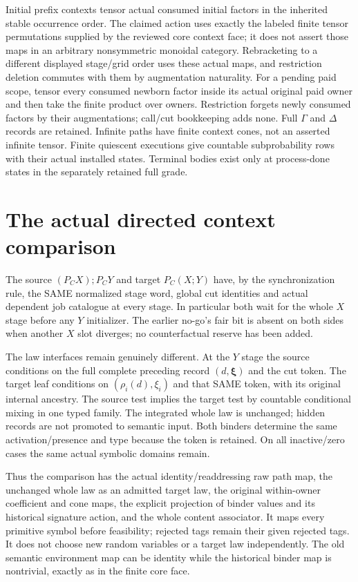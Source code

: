 \documentclass[11pt]{article}
\begin{document}
Initial prefix contexts tensor actual consumed initial factors in the inherited stable occurrence order. The claimed action uses exactly the labeled finite tensor permutations supplied by the reviewed core context face; it does not assert those maps in an arbitrary nonsymmetric monoidal category. Rebracketing to a different displayed stage/grid order uses these actual maps, and restriction deletion commutes with them by augmentation naturality. For a pending paid scope, tensor every consumed newborn factor inside its actual original paid owner and then take the finite product over owners. Restriction forgets newly consumed factors by their augmentations; call/cut bookkeeping adds none. Full $\Gamma$ and $\Delta$ records are retained. Infinite paths have finite context cones, not an asserted infinite tensor. Finite quiescent executions give countable subprobability rows with their actual installed states. Terminal bodies exist only at process-done states in the separately retained full grade.

\section{The actual directed context comparison}
The source $(P_CX);P_CY$ and target $P_C(X;Y)$ have, by the synchronization rule, the SAME normalized stage word, global cut identities and actual dependent job catalogue at every stage. In particular both wait for the whole $X$ stage before any $Y$ initializer. The earlier no-go's fair bit is absent on both sides when another $X$ slot diverges; no counterfactual reserve has been added.

The law interfaces remain genuinely different. At the $Y$ stage the source conditions on the full complete preceding record $(d,\boldsymbol\xi)$ and the cut token. The target leaf conditions on $(\rho_i(d),\xi_i)$ and that SAME token, with its original internal ancestry. The source test implies the target test by countable conditional mixing in one typed family. The integrated whole law is unchanged; hidden records are not promoted to semantic input. Both binders determine the same activation/presence and type because the token is retained. On all inactive/zero cases the same actual symbolic domains remain.

Thus the comparison has the actual identity/readdressing raw path map, the unchanged whole law as an admitted target law, the original within-owner coefficient and cone maps, the explicit projection of binder values and its historical signature action, and the whole content associator. It maps every primitive symbol before feasibility; rejected tags remain their given rejected tags. It does not choose new random variables or a target law independently. The old semantic environment map can be identity while the historical binder map is nontrivial, exactly as in the finite core face.
\end{document}
